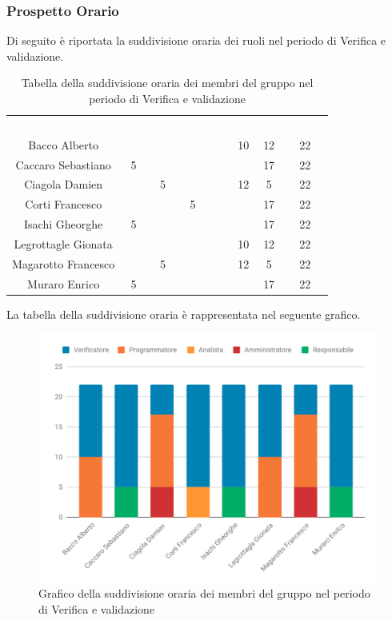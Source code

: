 \subsubsection{Prospetto Orario}
Di seguito è riportata la suddivisione oraria dei ruoli nel periodo di Verifica e validazione.




\begin{table}[H]	
	\begin{center}
	    \begin{tabular}{cccccccc}
			\rowcolor{greySWEight}
			\textcolor{white}{\textbf{Nome}} & \textcolor{white}{\textbf{Re}} & \textcolor{white}{\textbf{Am}} & \textcolor{white}{\textbf{An}} & \textcolor{white}{\textbf{Pj}} & \textcolor{white}{\textbf{Pr}} & \textcolor{white}{\textbf{Ve}} & \textcolor{white}{\textbf{Totale}}
			\\
			Bacco Alberto & & & & & 10 & 12 & 22 \\
			Caccaro Sebastiano & 5 & & & & & 17 & 22 \\
			Ciagola Damien & & 5 & & & 12 & 5 & 22 \\
			Corti Francesco & & & 5 & & & 17 & 22 \\
			Isachi Gheorghe & 5 & & & & & 17 & 22 \\
			Legrottagle Gionata & & & & & 10 & 12 & 22 \\
			Magarotto Francesco & & 5 & & & 12 & 5 & 22 \\
			Muraro Enrico & 5 & & & & & 17 & 22 \\
			\end{tabular}
	    \caption{Tabella della suddivisione oraria dei membri del gruppo nel periodo di Verifica e validazione} \label{tab:tabellaPersoneVerifica e validazione} 
	\end{center}
\end{table}

La tabella della suddivisione oraria è rappresentata nel seguente grafico.
\begin{figure}[H]
	\includegraphics[width=1\linewidth]{Preventivo/grafici/VV1.pdf}
	\caption{Grafico della suddivisione oraria dei membri del gruppo nel periodo di Verifica e validazione}
\end{figure}

